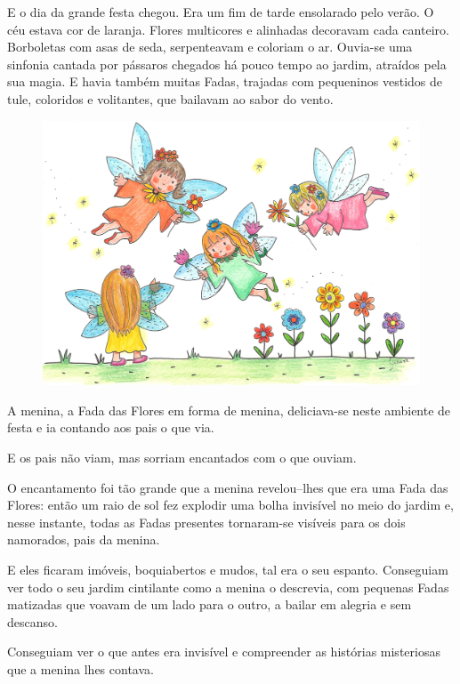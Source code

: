 \documentclass[12pt, a4paper, twoside]{memoir}
\begin{document}
E o dia da grande festa chegou.
\bigbreak
Era um fim de tarde ensolarado pelo verão. O céu estava cor de laranja. Flores multicores e alinhadas decoravam cada canteiro. Borboletas com  asas de seda, serpenteavam e coloriam o ar.
 Ouvia-se uma sinfonia cantada por pássaros chegados há pouco tempo ao jardim, atraídos pela sua magia. E havia também muitas Fadas, trajadas com pequeninos vestidos de tule, coloridos e volitantes, que bailavam ao sabor do vento.

\begin{figure}[h]
    \centering
    \includegraphics[width=1\textwidth]{na_festa}
\end{figure}

A menina, a Fada das Flores em forma de menina, deliciava-se neste ambiente de festa e ia contando aos pais o que via.

E os pais não viam, mas sorriam encantados com o que ouviam.

O encantamento foi tão grande que a menina revelou–lhes que era uma Fada das Flores: então um raio de sol fez explodir uma bolha invisível no meio do jardim e, nesse instante, todas as Fadas presentes tornaram-se visíveis para os dois namorados, pais da menina.

E eles ficaram imóveis, boquiabertos e mudos, tal era o seu espanto.
Conseguiam ver todo o seu jardim cintilante como a menina o descrevia, com pequenas Fadas matizadas que voavam de um lado para o outro, a bailar em alegria e sem descanso.

Conseguiam ver o que antes era invisível e compreender as histórias misteriosas que a menina lhes contava.
\end{document}

